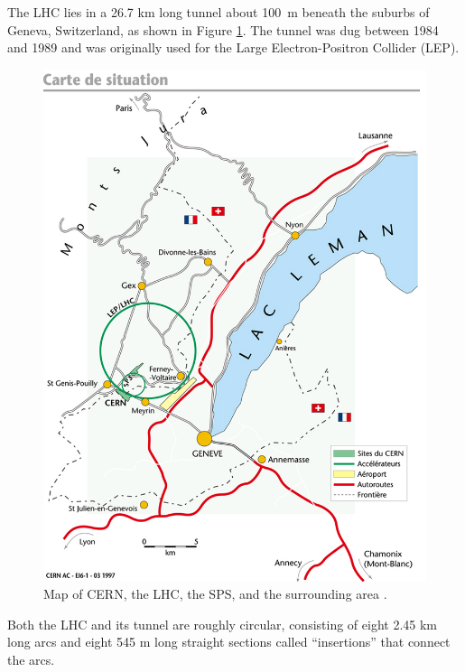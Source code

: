 The LHC lies in a 26.7 km long tunnel about 100~m beneath
the suburbs of Geneva, Switzerland, as shown in Figure \ref{fig:lhc-map}.
The tunnel was dug between 1984 and 1989 and was
originally used for the Large Electron-Positron Collider
(LEP).
\begin{figure}
  \centering
  \includegraphics[width=1.0\textwidth]{tex/lhc/fig/lhc-map.jpg}
  \caption{Map of CERN, the LHC, the SPS, and the surrounding area \cite{lhc-map}.}
  \label{fig:lhc-map}
\end{figure}
Both the LHC and its tunnel are roughly circular, consisting of 
eight 2.45 km long arcs and eight 545 m long straight sections
called ``insertions'' that connect the arcs.

